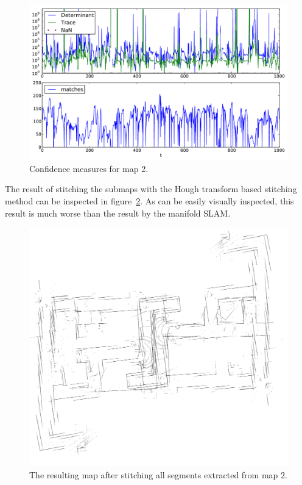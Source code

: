 \begin{figure}[ht]
\centering
  \includegraphics[width=\textwidth]{images/experiment/map3/error-measures.pdf}
  \caption{Confidence measures for map 2.}
  \label{fig:map3-confidence}
\end{figure}

The result of stitching the submaps with the Hough transform based stitching method can be inspected in figure~\ref{fig:map3-result}. As can be easily visually inspected, this result is much worse than the result by the manifold SLAM.

\begin{figure}[ht]
\centering
  \includegraphics[width=\textwidth]{images/experiment/map3/result/step2.png}
  \caption{The resulting map after stitching all segments extracted from map 2.}
  \label{fig:map3-result}
\end{figure}

